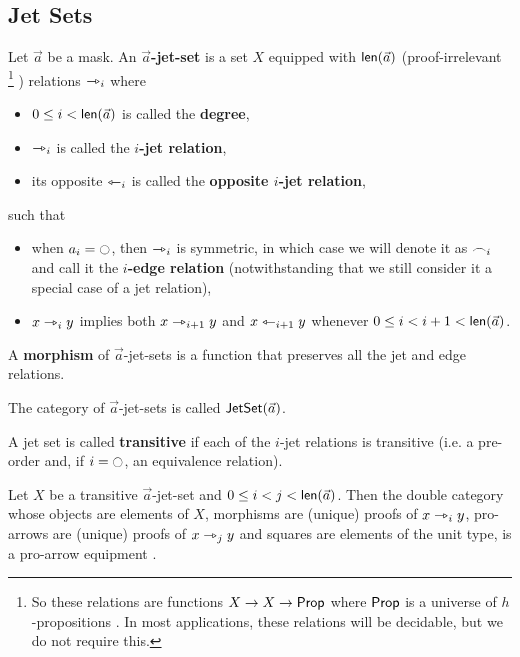 \documentclass[a4paper]{article}
\begin{document}
\subsection{Jet Sets}
\begin{definition} \label{def:jetset}
	Let $\vec a$ be a mask. An \textbf{$\vec a$-jet-set} is a set $X$ equipped with $\mathsf{len}(\vec a)$ (proof-irrelevant%
	\footnote{So these relations are functions $X \to X \to {\mathsf{Prop}}$ where ${\mathsf{Prop}}$ is a universe of $h$-propositions \cite{hottbook}. In most applications, these relations will be decidable, but we do not require this.}%
	) relations $\rightarrowtriangle_i$ where
	\begin{itemize}
		\item $0 \leq i < \mathsf{len}(\vec a)$ is called the \textbf{degree},
		\item $\rightarrowtriangle_i$ is called the \textbf{$i$-jet relation},
		\item its opposite $\leftarrowtriangle_i$ is called the \textbf{opposite $i$-jet relation},
	\end{itemize}
	such that
	\begin{itemize}
		\item when $a_i = \npolar$, then $\rightarrowtriangle_i$ is symmetric, in which case we will denote it as $\frown_i$ and call it the \textbf{$i$-edge relation} (notwithstanding that we still consider it a special case of a jet relation),
		\item $x \rightarrowtriangle_i y$ implies both $x \rightarrowtriangle_{i+1} y$ and $x \leftarrowtriangle_{i+1} y$ whenever $0 \leq i < i+1 < \mathsf{len}(\vec a)$.
	\end{itemize}
	A \textbf{morphism} of $\vec a$-jet-sets is a function that preserves all the jet and edge relations.
	
	The category of $\vec a$-jet-sets is called $\mathsf{JetSet}(\vec a)$.
	
	A jet set is called \textbf{transitive} if each of the $i$-jet relations is transitive (i.e. a pre-order and, if $i = \npolar$, an equivalence relation).
\end{definition}
\begin{proposition} \label{thm:jetset-equipment}
	Let $X$ be a transitive $\vec a$-jet-set and $0 \leq i < j < \mathsf{len}(\vec a)$.
	Then the double category whose objects are elements of $X$, morphisms are (unique) proofs of $x \rightarrowtriangle_i y$, pro-arrows are (unique) proofs of $x \rightarrowtriangle_{j} y$ and squares are elements of the unit type, is a pro-arrow equipment \cite{nlab:proarrow,proarrow1,proarrow2}.
\end{proposition}
\end{document}
